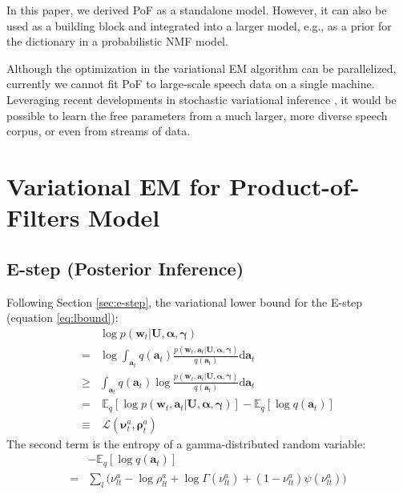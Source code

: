 \documentclass{article} %
\begin{document}
In this paper, we derived PoF as a standalone model. However, it can also be used as
a building block and integrated into a larger model, e.g., as a prior
for the dictionary in a probabilistic NMF model.

Although the optimization in the variational EM algorithm can be parallelized,
currently we cannot fit PoF to large-scale speech data on a single
machine. Leveraging recent developments in stochastic variational
inference \cite{hoffman2013stochastic}, it would be possible to learn
the free parameters from a much larger, more diverse speech corpus, or
even from streams of data.





\newpage
\appendix

\section{Variational EM for Product-of-Filters Model} \label{app:sf}

\subsection{E-step (Posterior Inference)} \label{app:e}
Following Section \ref{sec:e-step}, the variational lower bound for the E-step (equation \ref{eq:lbound}):
\begin{equation}
\begin{split}
& \log p(\bm{w}_t | \mathbf{U}, \bm{\alpha}, \bm{\gamma})\\
=&  \log \int_{\bm{a}_t} q(\bm{a}_t) \frac{p(\bm{w}_t, \bm{a}_t | \mathbf{U}, \bm{\alpha}, \bm{\gamma})}{q(\bm{a}_t)} \mathrm{d} \bm{a}_t\\
\geq&  \int_{\bm{a}_t} q(\bm{a}_t)  \log \frac{p(\bm{w}_t, \bm{a}_t | \mathbf{U}, \bm{\alpha}, \bm{\gamma})}{q(\bm{a}_t)} \mathrm{d}\bm{a}_t\\
=&~  \mathbb{E}_q [\log p(\bm{w}_t, \bm{a}_t | \mathbf{U}, \bm{\alpha}, \bm{\gamma})] - \mathbb{E}_q [\log q(\bm{a}_t)]\\
\equiv&~  \mathcal{L}(\bm{\nu}^a_t, \bm{\rho}^a_t)
\end{split}
\end{equation}
The second term is the entropy of a gamma-distributed random variable:
\begin{align*}
&-\mathbb{E}_q [\log q(\bm{a}_t)] \\
= &\sum_l \Big( \nu_{lt}^a - \log \rho_{lt}^a + \log \Gamma(\nu^a_{lt}) + (1 - \nu_{lt}^a)\psi(\nu_{lt}^a)\Big)
\end{align*}
\end{document}
